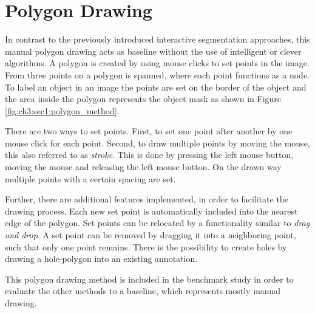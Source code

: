 
\section{Polygon Drawing}\label{ord:ch3:sec1}

In contrast to the previously introduced interactive segmentation approaches, this manual polygon drawing acts as baseline without the use of intelligent or clever algorithms.
A polygon is created by using mouse clicks to set points in the image.
From three points on a polygon is spanned, where each point functions as a node.
To label an object in an image the points are set on the border of the object and the area inside the polygon represents the object mask as shown in Figure \ref{fig:ch3:sec1:polygon_method}.

There are two ways to set points.
First, to set one point after another by one mouse click for each point.
Second, to draw multiple points by moving the mouse, this also referred to as \textit{stroke}.
This is done by pressing the left mouse button, moving the mouse and releasing the left mouse button.
On the drawn way multiple points with a certain spacing are set.

Further, there are additional features implemented, in order to facilitate the drawing process.
Each new set point is automatically included into the nearest edge of the polygon.
Set points can be relocated by a functionality similar to \textit{drag and drop}.
A set point can be removed by dragging it into a neighboring point, such that only one point remains.
There is the possibility to create holes by drawing a hole-polygon into an existing annotation.

This polygon drawing method is included in the benchmark study in order to evaluate the other methods to a baseline, which represents mostly manual drawing.

